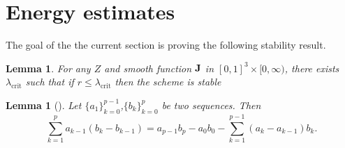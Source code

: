 \documentclass[12pt,reqno]{amsart}
\newcommand{\J}{{\bf J}}
\newtheorem{lem}[theorem]{Lemma}
\newtheorem{lemma}[theorem]{Lemma}
\theoremstyle{definition}
\numberwithin{equation}{section}
\begin{document}
	\section{Energy estimates}
	The goal of the the current section is proving the following stability result.
	\begin{lemma}\label{lem:coer}
		For any $Z$ and smooth function $\J$ in $[0,1]^3\times [0,\infty)$, there exists 
		$\lambda_{\mathrm{crit}}$ such that if $r\leq \lambda_{\mathrm{crit}}$ then
 the scheme is stable
		\end{lemma}
\begin{lem}[\cite{Morton}]
Let $\{a_1\}_{k=0}^{p-1}$,$\{b_k\}_{k=0}^{p}$ be two sequences. Then
$$
\sum_{k=1}^{p}a_{k-1}(b_k-b_{k-1})=a_{p-1}b_p-a_{0}b_0-\sum_{k=1}^{p-1}(a_{k}-a_{k-1})b_k.
$$
\end{lem}
\end{document}
